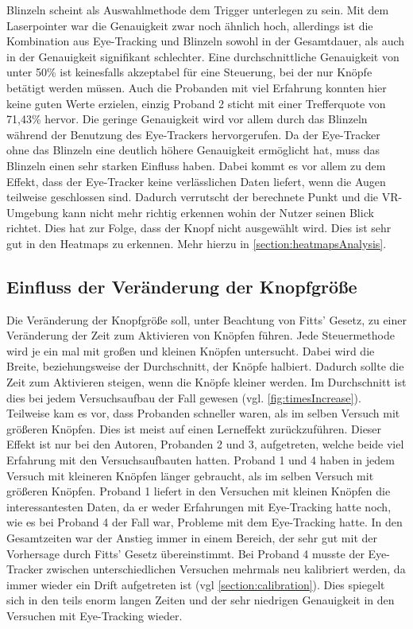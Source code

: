 Blinzeln scheint als Auswahlmethode dem Trigger unterlegen zu sein. Mit dem Laserpointer war die Genauigkeit zwar noch ähnlich hoch, allerdings ist die Kombination aus Eye-Tracking und Blinzeln sowohl in der Gesamtdauer, als auch in der Genauigkeit signifikant schlechter. Eine durchschnittliche Genauigkeit von unter 50\% ist keinesfalls akzeptabel für eine Steuerung, bei der nur Knöpfe betätigt werden müssen. Auch die Probanden mit viel Erfahrung konnten hier keine guten Werte erzielen, einzig Proband 2 sticht mit einer Trefferquote von 71,43\% hervor. Die geringe Genauigkeit wird vor allem durch das Blinzeln während der Benutzung des Eye-Trackers hervorgerufen. Da der Eye-Tracker ohne das Blinzeln eine deutlich höhere Genauigkeit ermöglicht hat, muss das Blinzeln einen sehr starken Einfluss haben. Dabei kommt es vor allem zu dem Effekt, dass der Eye-Tracker keine verlässlichen Daten liefert, wenn die Augen teilweise geschlossen sind. Dadurch verrutscht der berechnete Punkt und die \ac{VR}-Umgebung kann nicht mehr richtig erkennen wohin der Nutzer seinen Blick richtet. Dies hat zur Folge, dass der Knopf nicht ausgewählt wird. Dies ist sehr gut in den Heatmaps zu erkennen. Mehr hierzu in \autoref{section:heatmapsAnalysis}. 

\subsection{Einfluss der Veränderung der Knopfgröße}
Die Veränderung der Knopfgröße soll, unter Beachtung von Fitts' Gesetz, zu einer Veränderung der Zeit zum Aktivieren von Knöpfen führen. Jede Steuermethode wird je ein mal mit großen und kleinen Knöpfen untersucht. Dabei wird die Breite, beziehungsweise der Durchschnitt, der Knöpfe halbiert. Dadurch sollte die Zeit zum Aktivieren steigen, wenn die Knöpfe kleiner werden. Im Durchschnitt ist dies bei jedem Versuchsaufbau der Fall gewesen (vgl. \autoref{fig:timesIncrease}). Teilweise kam es vor, dass Probanden schneller waren, als im selben Versuch mit größeren Knöpfen. Dies ist meist auf einen Lerneffekt zurückzuführen. Dieser Effekt ist nur bei den Autoren, Probanden 2 und 3, aufgetreten, welche beide viel Erfahrung mit den Versuchsaufbauten hatten. Proband 1 und 4 haben in jedem Versuch mit kleineren Knöpfen länger gebraucht, als im selben Versuch mit größeren Knöpfen. Proband 1 liefert in den Versuchen mit kleinen Knöpfen die interessantesten Daten, da er weder Erfahrungen mit Eye-Tracking hatte noch, wie es bei Proband 4 der Fall war, Probleme mit dem Eye-Tracking hatte. In den Gesamtzeiten war der Anstieg immer in einem Bereich, der sehr gut mit der Vorhersage durch Fitts' Gesetz übereinstimmt. Bei Proband 4 musste der Eye-Tracker zwischen unterschiedlichen Versuchen mehrmals neu kalibriert werden, da immer wieder ein Drift aufgetreten ist (vgl \autoref{section:calibration}). Dies spiegelt sich in den teils enorm langen Zeiten und der sehr niedrigen Genauigkeit in den Versuchen mit Eye-Tracking wieder. 

